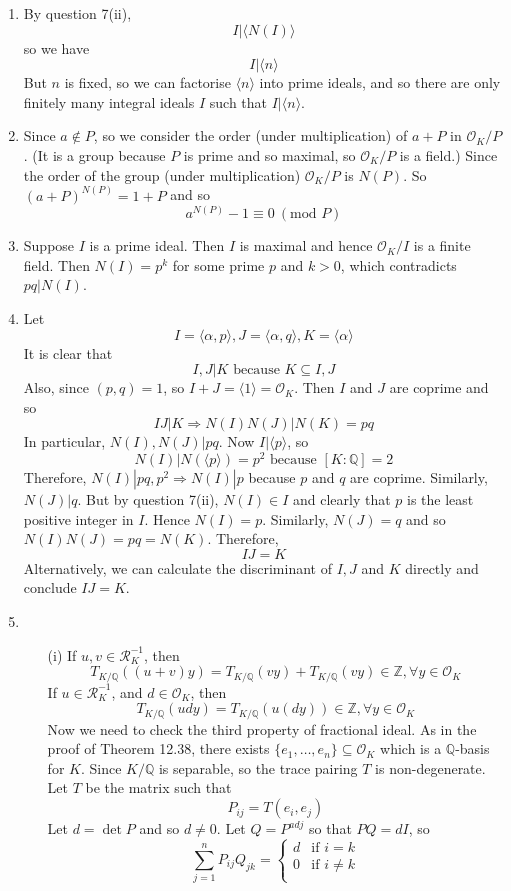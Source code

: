 \begin{enumerate}
\item By question 7(ii), $$I | \langle N(I) \rangle$$
   so we have
   $$I | \langle n \rangle$$
   But $n$ is fixed, so we can factorise $\langle n \rangle$ into prime ideals, and so there are only finitely many
   integral ideals $I$ such that $I| \langle n \rangle$.
\item Since $a \not \in P$, so we consider the order (under multiplication) of $a+P$ in $\mathcal{O}_K/P$. (It is a group because $P$ is prime and so maximal, so $\mathcal{O}_K/P$ is a field.)
   Since the order of the group (under multiplication) $\mathcal{O}_K/P$ is $N(P)$. So $(a+P)^{N(P)}=1+P$ and so
   $$a^{N(P)}-1 \equiv 0~(\text{mod } P)$$
\item Suppose $I$ is a prime ideal. Then $I$ is maximal and hence $\mathcal{O}_K/I$ is a finite field. Then
   $N(I)=p^k$ for some prime $p$ and $k>0$, which contradicts $pq \big|N(I)$.
\item Let
    $$I=\langle \alpha,p \rangle, J=\langle \alpha,q \rangle, K=\langle \alpha \rangle$$
    It is clear that
    $$I,J |K \text{ because } K \subseteq I,J$$
    Also, since $(p,q)=1$, so $I+J=\langle 1 \rangle=\mathcal{O}_K$. Then $I$ and $J$ are coprime and so
    $$IJ | K \Rightarrow N(I)N(J)|N(K)=pq$$
    In particular, $N(I),N(J)|pq$. Now $I|\langle p \rangle$, so
    $$N(I)| N(\langle p \rangle)=p^2 \text{ because } [K:\mathbb{Q}]=2$$
    Therefore, $N(I)|pq,p^2 \Rightarrow N(I)|p$ because $p$ and $q$ are coprime. Similarly, $N(J)|q$.
    But by question 7(ii), $N(I) \in I$ and clearly that $p$ is the least positive integer in $I$. Hence
    $N(I)=p$. Similarly, $N(J)=q$ and so $N(I)N(J)=pq=N(K)$. Therefore,
    $$IJ=K$$
    Alternatively, we can calculate the discriminant of $I,J$ and $K$ directly and conclude $IJ=K$.
\item \begin{enumerate}
    \item[(i)] If $u,v \in \mathcal{R}^{-1}_K$, then
    $$T_{K/\mathbb{Q}}((u+v)y)=T_{K/\mathbb{Q}}(vy)+T_{K/\mathbb{Q}}(vy) \in \mathbb{Z}, \forall y \in \mathcal{O}_K$$
    If $u \in \mathcal{R}^{-1}_K$, and $d \in \mathcal{O}_K$, then
    $$T_{K/\mathbb{Q}}(udy)=T_{K/\mathbb{Q}}(u(dy)) \in \mathbb{Z}, \forall y \in \mathcal{O}_K$$
    Now we need to check the third property of fractional ideal. As in the proof of
    Theorem 12.38, there exists
    $\{e_1,\ldots,e_n\} \subseteq \mathcal{O}_K$ which is a $\mathbb{Q}$-basis for $K$. Since $K/\mathbb{Q}$ is
    separable, so the trace pairing $T$ is non-degenerate. Let $T$ be the matrix such that
    $$P_{ij}=T(e_i,e_j)$$
    Let $d=\det{P}$ and so $d \neq 0$. Let $Q=P^{adj}$ so that $PQ=d I$, so
\begin{equation*}
\sum_{j=1}^n P_{ij}Q_{jk}= \left\{
\begin{array}{ll}
d & \text{if } i=k\\
0 & \text{if } i \neq k\\
\end{array} \right.
\end{equation*}


\end{enumerate}
\end{enumerate}
